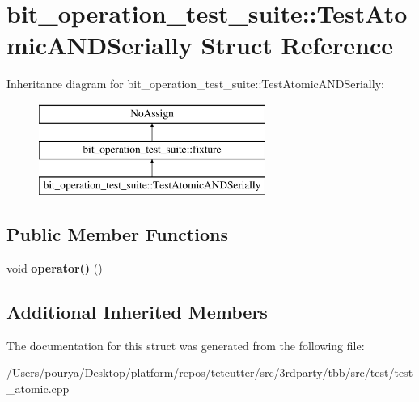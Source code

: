 \hypertarget{structbit__operation__test__suite_1_1TestAtomicANDSerially}{}\section{bit\+\_\+operation\+\_\+test\+\_\+suite\+:\+:Test\+Atomic\+A\+N\+D\+Serially Struct Reference}
\label{structbit__operation__test__suite_1_1TestAtomicANDSerially}
Inheritance diagram for bit\+\_\+operation\+\_\+test\+\_\+suite\+:\+:Test\+Atomic\+A\+N\+D\+Serially\+:\begin{figure}[H]
\begin{center}
\leavevmode
\includegraphics[height=3.000000cm]{structbit__operation__test__suite_1_1TestAtomicANDSerially}
\end{center}
\end{figure}
\subsection*{Public Member Functions}
\begin{DoxyCompactItemize}
\item 
\hypertarget{structbit__operation__test__suite_1_1TestAtomicANDSerially_a0c331f5beab01d454e2a4dc714112575}{}void {\bfseries operator()} ()\label{structbit__operation__test__suite_1_1TestAtomicANDSerially_a0c331f5beab01d454e2a4dc714112575}

\end{DoxyCompactItemize}
\subsection*{Additional Inherited Members}


The documentation for this struct was generated from the following file\+:\begin{DoxyCompactItemize}
\item 
/\+Users/pourya/\+Desktop/platform/repos/tetcutter/src/3rdparty/tbb/src/test/test\+\_\+atomic.\+cpp\end{DoxyCompactItemize}
